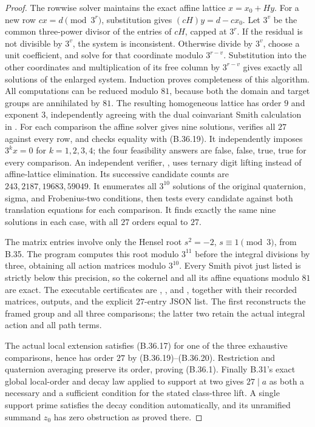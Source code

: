 \begin{proof}
The rowwise solver maintains the exact affine lattice
$x=x_0+H y$. For a new row $c x=d\pmod{3^r}$,
substitution gives $(cH)y=d-cx_0$. Let $3^v$ be the
common three-power divisor of the entries of $cH$,
capped at $3^r$. If the residual is not divisible by
$3^v$, the system is inconsistent. Otherwise divide
by $3^v$, choose a unit coefficient, and solve for that
coordinate modulo $3^{r-v}$. Substitution into the other
coordinates and multiplication of its free column by
$3^{r-v}$ gives exactly all solutions of the enlarged
system. Induction proves completeness of this algorithm.
All computations can be reduced modulo $81$, because
both the domain and target groups are annihilated by
$81$.
The resulting homogeneous lattice has order $9$ and
exponent $3$, independently agreeing with the dual
coinvariant Smith calculation in
.
For each comparison the affine solver gives nine
solutions, verifies all $27$ against every row, and
checks equality with (B.36.19).
It independently imposes $3^k x=0$ for $k=1,2,3,4$;
the four feasibility answers are false, false, true,
true for every comparison.
An independent verifier, ,
uses ternary digit lifting instead of affine-lattice
elimination. Its successive candidate counts are
$243,2187,19683,59049$. It enumerates all $3^{10}$
solutions of the original quaternion, sigma, and
Frobenius-two conditions, then tests every candidate
against both translation equations for each comparison.
It finds exactly the same nine solutions in each case,
with all $27$ orders equal to $27$.

The matrix entries involve only the Hensel root
$s^2=-2$, $s\equiv1\pmod3$, from B.35.
The program computes this root modulo $3^{11}$ before
the integral divisions by three, obtaining all action
matrices modulo $3^{10}$. Every Smith pivot just listed
is strictly below this precision, so the cokernel and
all its affine equations modulo $81$ are exact.
The executable certificates are
,
, and
, together with their
recorded matrices, outputs, and the explicit $27$-entry
JSON list. The first reconstructs the framed group and
all three comparisons; the latter two retain the actual
integral action and all path terms.

The actual local extension satisfies (B.36.17) for one
of the three exhaustive comparisons, hence has order
$27$ by (B.36.19)--(B.36.20). Restriction and quaternion
averaging preserve its order, proving (B.36.1).
Finally B.31's exact global local-order and decay law
applied to support at two gives $27\mid a$ as both a
necessary and a sufficient condition for the stated
class-three lift. A single support prime satisfies the
decay condition automatically, and its unramified
summand $z_0$ has zero obstruction as proved there.
\end{proof}
